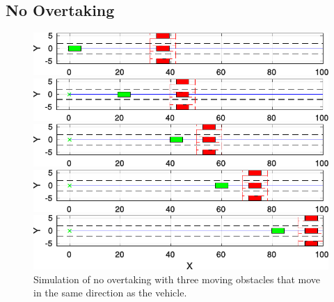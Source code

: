 \subsection{No Overtaking}
\begin{figure}[h!]
	\centering
	\begin{minipage}[t]{\textwidth}
		\includegraphics[width=\textwidth]{../figure/no_overtaking/no_overtaking_1.pdf}
	\end{minipage}
	\begin{minipage}[t]{\textwidth}
		\includegraphics[width=\textwidth]{../figure/no_overtaking/no_overtaking_1_5.pdf}
	\end{minipage}
	\begin{minipage}[t]{\textwidth}
		\includegraphics[width=\textwidth]{../figure/no_overtaking/no_overtaking_2.pdf}
	\end{minipage}
	\begin{minipage}[t]{\textwidth}
		\includegraphics[width=\textwidth]{../figure/no_overtaking/no_overtaking_3.pdf}
	\end{minipage}
	\begin{minipage}[t]{\textwidth}
		\includegraphics[width=\textwidth]{../figure/no_overtaking/no_overtaking_4.pdf}
	\end{minipage}
	\caption{Simulation of no overtaking with three moving obstacles that move in the same direction as the vehicle.}
	\label{fig:obstacleAvoidance_no_overtaking}
\end{figure}

